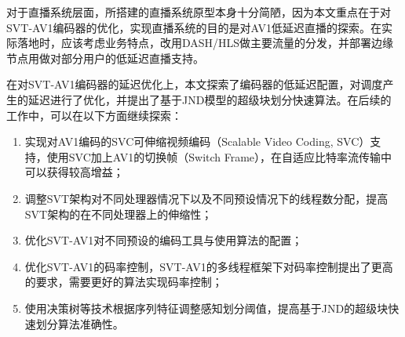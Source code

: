 \begin{summary}
	对于直播系统层面，所搭建的直播系统原型本身十分简陋，因为本文重点在于对SVT-AV1编码器的优化，实现直播系统的目的是对AV1低延迟直播的探索。在实际落地时，应该考虑业务特点，改用DASH/HLS做主要流量的分发，并部署边缘节点用做对部分用户的低延迟直播支持。

	在对SVT-AV1编码器的延迟优化上，本文探索了编码器的低延迟配置，对调度产生的延迟进行了优化，并提出了基于JND模型的超级块划分快速算法。在后续的工作中，可以在以下方面继续探索：
	\begin{enumerate}
		\item 实现对AV1编码的SVC可伸缩视频编码（Scalable Video Coding, SVC）支持，使用SVC加上AV1的切换帧（Switch Frame），在自适应比特率流传输中可以获得较高增益；
		\item 调整SVT架构对不同处理器情况下以及不同预设情况下的线程数分配，提高SVT架构的在不同处理器上的伸缩性；
		\item 优化SVT-AV1对不同预设的编码工具与使用算法的配置；
		\item 优化SVT-AV1的码率控制，SVT-AV1的多线程框架下对码率控制提出了更高的要求，需要更好的算法实现码率控制；
		\item 使用决策树等技术根据序列特征调整感知划分阈值，提高基于JND的超级块快速划分算法准确性。
	\end{enumerate}
\end{summary}
